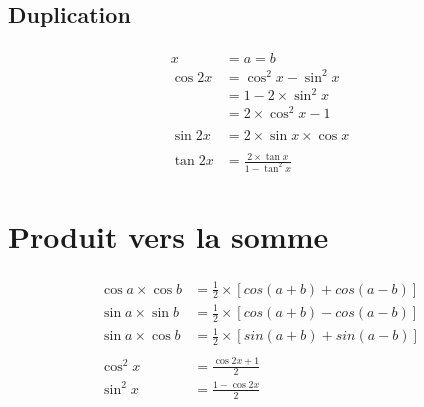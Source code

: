 \documentclass[a4paper]{article}
\begin{document}
\begin{center}
		\item \subsection*{Duplication}
		\vspace{-0.4cm}
		\begin{gather*}
			\begin{split}
				x &= a = b\\
				\cos{2x} &= \cos^2{x}-\sin^2{x}\\
				&= 1 - 2\times\sin^2{x}\\
				&= 2\times\cos^2{x} - 1\\
				\\
				\sin{2x} &= 2\times\sin{x}\times\cos{x}\\
				\\
				\tan{2x} &= \frac{2\times\tan{x}}{1-\tan^2{x}}
			\end{split}
		\end{gather*}
	\end{center}
	
	\vspace{2cm}
	\section{Produit vers la somme}
	\vspace{-0.4cm}
	\begin{gather*}
		\begin{split}
			\cos{a}\times\cos{b} &= \frac{1}{2}\times\left[cos\left(a+b\right) + cos\left(a-b\right)\right]\\
			\sin{a}\times\sin{b} &= \frac{1}{2}\times\left[cos\left(a+b\right) - cos\left(a-b\right)\right]\\
			\sin{a}\times\cos{b} &= \frac{1}{2}\times\left[sin\left(a+b\right) + sin\left(a-b\right)\right]\\
			\\
			\cos^2{x} &= \frac{\cos{2x}+1}{2}\\
			\sin^2{x} &= \frac{1-\cos{2x}}{2}
		\end{split}
	\end{gather*}

	\vspace{0.5cm}
\end{document}
